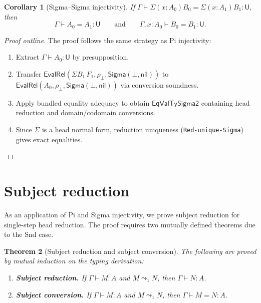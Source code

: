 \documentclass[11pt]{article}
\newcommand{\hastype}[3]{#1 \vdash #2 : #3}
\newcommand{\conveq}[4]{#1 \vdash #2 = #3 : #4}
\newcommand{\U}{\mathsf{U}}
\newcommand{\SigmaC}[2]{\mathsf{Sigma}(#1,#2)}
\newcommand{\Sigmatype}[2]{\Sigma(#1)#2}
\newtheorem{theorem}{Theorem}
\newtheorem{corollary}[theorem]{Corollary}
\begin{document}
\begin{corollary}[Sigma--Sigma injectivity]
  If\/ $\conveq{\Gamma}{\Sigmatype{x{:}A_0}{B_0}}{\Sigmatype{x{:}A_1}{B_1}}{\U}$,
  then
  \[
    \conveq{\Gamma}{A_0}{A_1}{\U}
    \qquad\text{and}\qquad
    \conveq{\Gamma, x{:}A_0}{B_0}{B_1}{\U}.
  \]
\end{corollary}

\begin{proof}[Proof outline]
  The proof follows the same strategy as Pi injectivity:
  \begin{enumerate}
    \item Extract $\hastype{\Gamma}{A_0}{\U}$ by presupposition.
    \item Transfer
      $\mathsf{EvalRel}(\Sigma B_1\,F_1, \rho_\bot, \SigmaC{\bot}{\mathsf{nil}})$
      to $\mathsf{EvalRel}(A_0, \rho_\bot, \SigmaC{\bot}{\mathsf{nil}})$
      via conversion soundness.
    \item Apply bundled equality adequacy to obtain
      $\mathsf{EqValTySigma2}$ containing head reduction and
      domain/codomain conversions.
    \item Since $\Sigma$ is a head normal form, reduction uniqueness
      (\texttt{Red-unique-Sigma}) gives exact equalities.
  \end{enumerate}
\end{proof}

\section{Subject reduction}

As an application of Pi and Sigma injectivity, we prove subject
reduction for single-step head reduction.  The proof requires two
mutually defined theorems due to the Snd case.

\begin{theorem}[Subject reduction and subject conversion]
  \label{thm:subject-red}
  The following are proved by mutual induction on the typing
  derivation:
  \begin{enumerate}
    \item \textbf{Subject reduction.}\; If\/
      $\hastype{\Gamma}{M}{A}$ and $M \leadsto_1 N$, then
      $\hastype{\Gamma}{N}{A}$.
    \item \textbf{Subject conversion.}\; If\/
      $\hastype{\Gamma}{M}{A}$ and $M \leadsto_1 N$, then
      $\conveq{\Gamma}{M}{N}{A}$.
  \end{enumerate}
\end{theorem}
\end{document}
